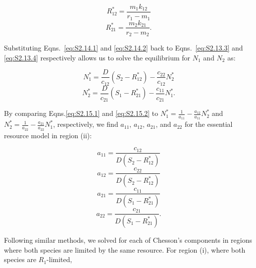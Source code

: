 \begin{equation}
R_{12}^{*}=\frac{m_{1}k_{12}}{r_{1}-m_{1}}
\tag{S2.14.1}\label{eq:S2.14.1}
\end{equation}
\begin{equation}
R_{21}^{*}=\frac{m_{2}k_{21}}{r_{2}-m_{2}}.
\tag{S2.14.2}\label{eq:S2.14.2}
\end{equation}

Substituting Eqns.~\ref{eq:S2.14.1} and \ref{eq:S2.14.2} back to Eqns.~\ref{eq:S2.13.3} and \ref{eq:S2.13.4} respectively allows us to solve the equilibrium for $N_{1}$ and $N_{2}$ as:

\begin{equation}
N_{1}^{*}=\frac{D}{c_{12}}\left ( S_{2}-{R_{12}^{*}} \right )-\frac{c_{22}}{c_{12}}N_{2}^{*}
\tag{S2.15.1}\label{eq:S2.15.1}
\end{equation}
\begin{equation}
N_{2}^{*}=\frac{D}{c_{21}}\left ( S_{1}-{R_{21}^{*}} \right )-\frac{c_{11}}{c_{21}}N_{1}^{*}.
\tag{S2.15.2}\label{eq:S2.15.2}
\end{equation}

\noindent By comparing Eqns.\ref{eq:S2.15.1} and \ref{eq:S2.15.2} to $N_{1}^{*}=\frac{1}{a_{11}}-\frac{a_{12}}{a_{11}}N_{2}^{*}$ and $N_{2}^{*}=\frac{1}{a_{22}}-\frac{a_{21}}{a_{22}}N_{1}^{*}$, respectively, we find $a_{11}$, $a_{12}$, $a_{21}$, and $a_{22}$ for the essential resource model in region (ii):

\begin{equation}
a_{11}=\frac{c_{12}}{D\left ( S_{2}-R_{12}^{*} \right )}
\tag{S2.16.1}\label{eq:S2.16.1}
\end{equation}
\begin{equation}
a_{12}=\frac{c_{22}}{D\left ( S_{2}-R_{12}^{*} \right )}
\tag{S2.16.2}\label{eq:S2.16.2}
\end{equation}
\begin{equation}
a_{21}=\frac{c_{11}}{D\left ( S_{1}-R_{21}^{*} \right )}
\tag{S2.16.3}\label{eq:S2.16.3}
\end{equation}
\begin{equation}
a_{22}=\frac{c_{21}}{D\left ( S_{1}-R_{21}^{*} \right )}.
\tag{S2.16.4}\label{eq:S2.16.4}
\end{equation}

\noindent Following similar methods, we solved for each of Chesson's components in regions where both species are limited by the same resource. For region (i), where both species are $R_{1}$-limited, 

